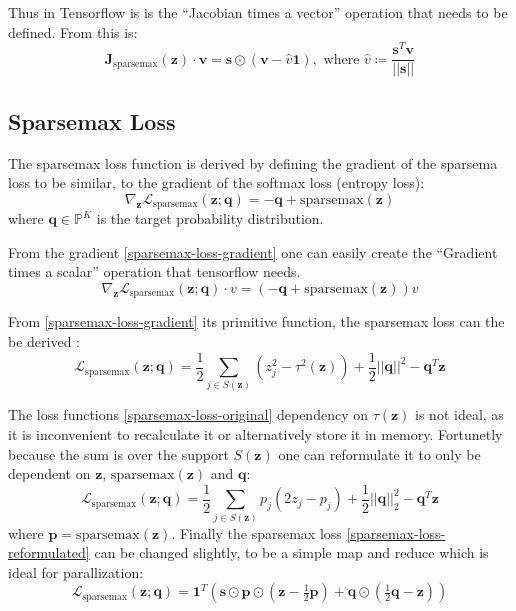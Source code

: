 Thus in Tensorflow is is the ``Jacobian times a vector'' operation that needs to be defined. From \cite{sparsemax} this is:
\begin{equation}
\mathbf{J}_{\mathrm{sparsemax}}(\mathbf{z}) \cdot \mathbf{v} = \mathbf{s} \odot (\mathbf{v} - \hat{v} \mathbf{1}), \text{  where } \hat{v} \coloneqq \frac{\mathbf{s}^T \mathbf{v}}{||\mathbf{s}||}
\end{equation}

\subsection{Sparsemax Loss}

The sparsemax loss function is derived by defining the gradient of the sparsema loss to be similar, to the gradient of the softmax loss (entropy loss):
\begin{equation}
\nabla_{\mathbf{z}} \mathcal{L}_{\mathrm{sparsemax}}(\mathbf{z}; \mathbf{q}) = -\mathbf{q} + \mathrm{sparsemax}(\mathbf{z})
\label{sparsemax-loss-gradient}
\end{equation}
where $\mathbf{q} \in \mathbb{P}^K$ is the target probability distribution.

From the gradient \eqref{sparsemax-loss-gradient} one can easily create the ``Gradient times a scalar'' operation that tensorflow needs.
\begin{equation}
\nabla_{\mathbf{z}} \mathcal{L}_{\mathrm{sparsemax}}(\mathbf{z}; \mathbf{q}) \cdot v = (-\mathbf{q} + \mathrm{sparsemax}(\mathbf{z})) v
\end{equation}

From \eqref{sparsemax-loss-gradient} its primitive function, the sparsemax loss can the be derived \cite{sparsemax}:
\begin{equation}
\mathcal{L}_{\mathrm{sparsemax}}(\mathbf{z}; \mathbf{q}) = \frac{1}{2} \sum_{j \in S(\mathbf{z})} (z_j^2 - \tau^2(\mathbf{z})) + \frac{1}{2} ||\mathbf{q}||^2 - \mathbf{q}^T \mathbf{z}
\label{sparsemax-loss-original}
\end{equation}

The loss functions \eqref{sparsemax-loss-original} dependency on $\tau(\mathbf{z})$ is not ideal, as it is inconvenient to recalculate it or alternatively store it in memory. Fortunetly because the sum is over the support $S(\mathbf{z})$ one can reformulate it to only be dependent on $\mathbf{z}$, $\mathrm{sparsemax}(\mathbf{z})$ and $\mathbf{q}$:
\begin{equation}
\mathcal{L}_{\mathrm{sparsemax}}(\mathbf{z}; \mathbf{q}) = \frac{1}{2} \sum_{j \in S(\mathbf{z})} p_j (2 z_j - p_j) + \frac{1}{2} ||\mathbf{q}||_2^2 - \mathbf{q}^T \mathbf{z}
\label{sparsemax-loss-reformulated}
\end{equation}
where $\mathbf{p} = \mathrm{sparsemax}(\mathbf{z})$. Finally the sparsemax loss \eqref{sparsemax-loss-reformulated} can be changed slightly, to be a simple map and reduce which is ideal for parallization:
\begin{equation}
\mathcal{L}_{\mathrm{sparsemax}}(\mathbf{z}; \mathbf{q}) = \mathbf{1}^T \left( \mathbf{s} \odot \mathbf{p} \odot \left(\mathbf{z} - \tfrac{1}{2} \mathbf{p}\right) + \mathbf{q} \odot \left(\tfrac{1}{2} \mathbf{q} - \mathbf{z}\right)\right)
\end{equation}
